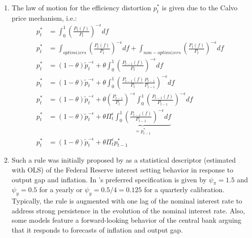 \begin{enumerate}
\item The law of motion for the efficiency distortion $p_t^*$ is given due to the Calvo price mechanism, i.e.:
	\begin{align*}
	p_t^* &= \int_0^1\left(\frac{P_t(f)}{P_t}\right)^{-\epsilon} df\\
	p_t^* &= \int_{optimizers} \left(\frac{P_t(f)}{P_t}\right)^{-\epsilon} df + \int_{non-optimizers}\left(\frac{P_t(f)}{P_t}\right)^{-\epsilon} df\\
	p_t^* & = (1-\theta) \widetilde{p}_t^{-\epsilon} + \theta \int_0^1 \left(\frac{P_{t-1}(f)}{P_t}\right)^{-\epsilon} df\\
	p_t^* & = (1-\theta) \widetilde{p}_t^{-\epsilon} + \theta \int_0^1 \left(\frac{P_{t-1}(f)}{P_t }\frac{P_{t-1}}{P_{t-1}}\right)^{-\epsilon} df\\
	p_t^* & = (1-\theta) \widetilde{p}_t^{-\epsilon} + \theta \left(\frac{P_{t-1}}{P_{t}}\right)^{-\epsilon} \int_0^1 \left(\frac{P_{t-1}(f)}{P_{t-1} }\right)^{-\epsilon} df\\
	p_t^* & = (1-\theta) \widetilde{p}_t^{-\epsilon} + \theta \Pi_t^{\epsilon} \underbrace{\int_0^1 \left(\frac{P_{t-1}(f)}{P_{t-1} }\right)^{-\epsilon} df}_{=p_{t-1}^*}\\
	p_t^* & = (1-\theta) \widetilde{p}_t^{-\epsilon} + \theta \Pi_t^{\epsilon} p_{t-1}^*
	\end{align*}


  \item Such a rule was initially proposed by \textcite{Taylor_1993_DiscretionPolicyRules}
  as a statistical descriptor (estimated with OLS) of the Federal Reserve interest setting behavior in response to output gap and inflation.
In \textcite{Taylor_1993_DiscretionPolicyRules}'s preferred specification is given by $\psi_\pi=1.5$ and $\psi_y=0.5$ for a yearly or $\psi_y=0.5/4=0.125$ for a quarterly calibration.
Typically, the rule is augmented with one lag of the nominal interest rate to address strong persistence in the evolution of the nominal interest rate.
Also, some models feature a forward-looking behavior of the central bank arguing that it responds to forecasts of inflation and output gap.

\end{enumerate}